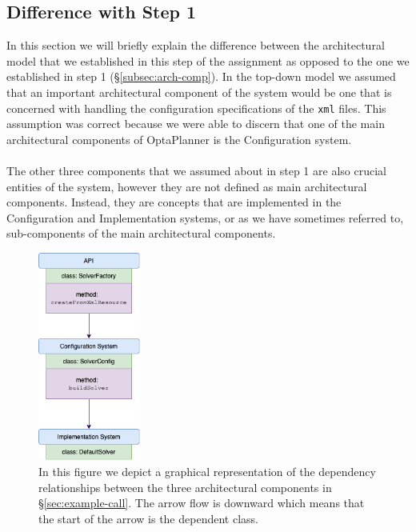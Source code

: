 \subsection{Difference with Step 1}
In this section we will briefly explain the difference between the architectural model that we established in this step of the assignment as opposed to the one we established in step 1 (\S\ref{subsec:arch-comp}). In the top-down model we assumed that an important architectural component of the system would be one that is concerned with handling the configuration specifications of the \verb!xml! files. This assumption was correct because we were able to discern that one of the main architectural components of OptaPlanner is the Configuration system.\\\\
The other three components that we assumed about in step 1 are also crucial entities of the system, however they are not defined as main architectural components. Instead, they are concepts that are implemented in the Configuration and Implementation systems, or as we have sometimes referred to, sub-components of the main architectural components.
\begin{figure}
    \centering
    \includegraphics[width=0.3\textwidth]{figures/example-call.png}
    \caption{In this figure we depict a graphical representation of the dependency relationships between the three architectural components in \S \ref{sec:example-call}. The arrow flow is downward which means that the start of the arrow is the dependent class.}
    \label{fig:example-call}
\end{figure}